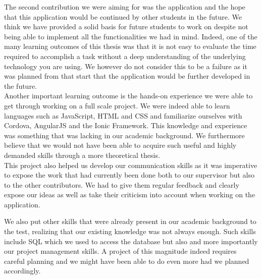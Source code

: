\documentclass{eplmastersthesis}
\begin{document}
The second contribution we were aiming for was the application and the hope that this application would be continued by other students in the future. We think we have provided a solid basis for future students to work on despite not being able to implement all the functionalities we had in mind. Indeed, one of the many learning outcomes of this thesis was that it is not easy to evaluate the time required to accomplish a task without a deep understanding of the underlying technology you are using. We however do not consider this to be a failure as it was planned from that start that the application would be further developed in the future.\\

Another important learning outcome is the hands-on experience we were able to get through working on a full scale project. We were indeed able to learn languages such as JavaScript, HTML and CSS and familiarize ourselves with Cordova, AngularJS and the Ionic Framework. This knowledge and experience was something that was lacking in our academic background. We furthermore believe that we would not have been able to acquire such useful and highly demanded skills through a more theoretical thesis.\\

This project also helped us develop our communication skills as it was imperative to expose the work that had currently been done both to our supervisor but also to the other contributors. We had to give them regular feedback and clearly expose our ideas as well as take their criticism into account when working on the application.\\

\newpage

We also put other skills that were already present in our academic background to the test, realizing that our existing knowledge was not always enough. Such skills include SQL which we used to access the database but also and more importantly our project management skills. A project of this magnitude indeed requires careful planning and we might have been able to do even more had we planned accordingly.\\
\end{document}
